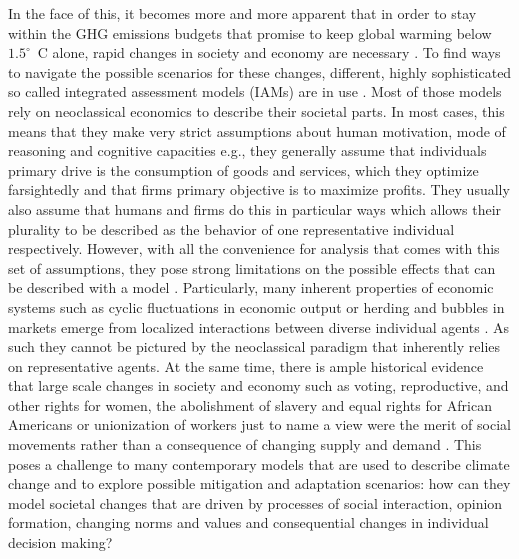 In the face of this, it becomes more and more apparent that in order to stay within the GHG emissions budgets that promise to keep global warming below $1.5^\circ$~C alone, rapid changes in society and economy are necessary \citep{Rockstrom2017, Geels2017}.
To find ways to navigate the possible scenarios for these changes, different, highly sophisticated so called integrated assessment models (IAMs) are in use \citep{VanVuuren2016}.
Most of those models rely on neoclassical economics to describe their societal parts. In most cases, this means that they make very strict assumptions about human motivation, mode of reasoning and cognitive capacities e.g., they generally assume that individuals primary drive is the consumption of goods and services, which they optimize farsightedly and that firms primary objective is to maximize profits. They usually also assume that humans and firms do this in particular ways which allows their plurality to be described as the behavior of one representative individual respectively.
However, with all the convenience for analysis that comes with this set of assumptions, they pose strong limitations on the possible effects that can be described with a model \citep{Kirman1992}.
Particularly, many inherent properties of economic systems such as cyclic fluctuations in economic output or herding and bubbles in markets emerge from localized interactions between diverse individual agents \citep{Levin1998, Tesfatsion2003, Anderson2018}. As such they cannot be pictured by the neoclassical paradigm that inherently relies on representative agents. 
At the same time, there is ample historical evidence that large scale changes in society and economy such as voting, reproductive, and other rights for women, the abolishment of slavery and equal rights for African Americans or unionization of workers just to name a view were the merit of social movements rather than a consequence of changing supply and demand \citep{Tarrow2011, Tilly2019}. 
This poses a challenge to many contemporary models that are used to describe climate change and to explore possible mitigation and adaptation scenarios: how can they model societal changes that are driven by processes of social interaction, opinion formation, changing norms and values and consequential changes in individual decision making?

